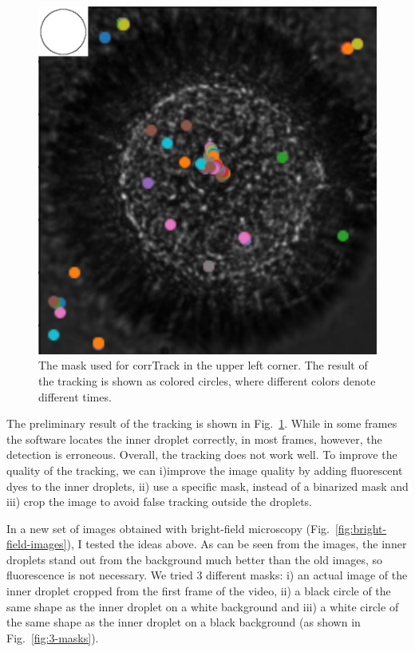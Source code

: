 \documentclass[onecolumn,aps, pre,amsmath,amssymb,longbibliography,11pt]{revtex4-2}
\begin{document}
\begin{figure}[h]
  \includegraphics{mask-and-result}
  \caption{The mask used for corrTrack in the upper left corner.
  The result of the tracking is shown as colored circles, where different colors denote different times.}
  \label{fig:mask-and-result}
\end{figure}

The preliminary result of the tracking is shown in Fig.~\ref{fig:mask-and-result}.
While in some frames the software locates the inner droplet correctly, in most frames, however, the detection is erroneous.
Overall, the tracking does not work well.
To improve the quality of the tracking, we can
i)improve the image quality by adding fluorescent dyes to the inner droplets,
ii) use a specific mask, instead of a binarized mask and
iii) crop the image to avoid false tracking outside the droplets.

In a new set of images obtained with bright-field microscopy (Fig.~\ref{fig:bright-field-images}), I tested the ideas above.
As can be seen from the images, the inner droplets stand out from the background much better than the old images, so fluorescence is not necessary.
We tried 3 different masks:
i) an actual image of the inner droplet cropped from the first frame of the video,
ii) a black circle of the same shape as the inner droplet on a white background and
iii) a white circle of the same shape as the inner droplet on a black background (as shown in Fig.~\ref{fig:3-masks}).
\end{document}
